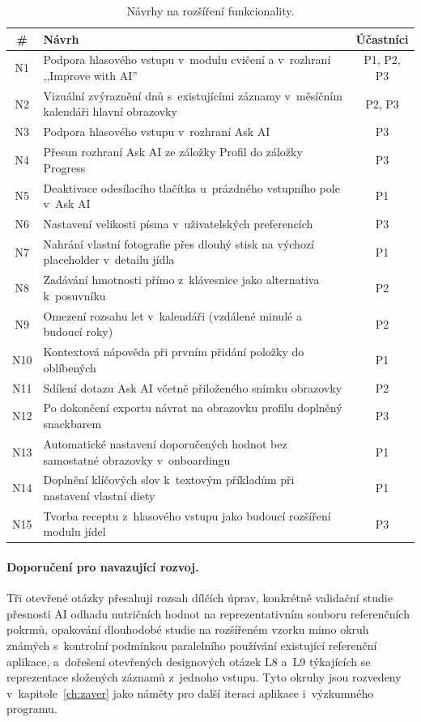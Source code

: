 \begin{table}[ht]
	\centering
	\caption{Návrhy na rozšíření funkcionality.}
	\label{tab:navrhyFunkce}
	\small
	\begin{tabularx}{\textwidth}{@{}c X c@{}}
		\toprule
		\textbf{\#} & \textbf{Návrh} & \textbf{Účastníci} \\
		\midrule
		N1 & Podpora hlasového vstupu v~modulu cvičení a v~rozhraní ,,Improve with AI'' & P1, P2, P3 \\
		N2 & Vizuální zvýraznění dnů s~existujícími záznamy v~měsíčním kalendáři hlavní obrazovky & P2, P3 \\
		N3 & Podpora hlasového vstupu v~rozhraní Ask AI & P3 \\
		N4 & Přesun rozhraní Ask AI ze záložky Profil do záložky Progress & P3 \\
		N5 & Deaktivace odesílacího tlačítka u~prázdného vstupního pole v~Ask AI & P1 \\
		N6 & Nastavení velikosti písma v~uživatelských preferencích & P3 \\
		N7 & Nahrání vlastní fotografie přes dlouhý stisk na výchozí placeholder v~detailu jídla & P1 \\
		N8 & Zadávání hmotnosti přímo z~klávesnice jako alternativa k~posuvníku & P2 \\
		N9 & Omezení rozsahu let v~kalendáři (vzdálené minulé a budoucí roky) & P2 \\
		N10 & Kontextová nápověda při prvním přidání položky do oblíbených & P1 \\
		N11 & Sdílení dotazu Ask AI včetně přiloženého snímku obrazovky & P2 \\
		N12 & Po dokončení exportu návrat na obrazovku profilu doplněný snackbarem & P3 \\
		N13 & Automatické nastavení doporučených hodnot bez samostatné obrazovky v~onboardingu & P1 \\
		N14 & Doplnění klíčových slov k~textovým příkladům při nastavení vlastní diety & P1 \\
		N15 & Tvorba receptu z~hlasového vstupu jako budoucí rozšíření modulu jídel & P3 \\
		\bottomrule
	\end{tabularx}
\end{table}

\paragraph{Doporučení pro navazující rozvoj.}
Tři otevřené otázky přesahují rozsah dílčích úprav, konkrétně validační studie přesnosti AI odhadu nutričních hodnot na reprezentativním souboru referenčních pokrmů, opakování dlouhodobé studie na rozšířeném vzorku mimo okruh známých s~kontrolní podmínkou paralelního používání existující referenční aplikace, a~dořešení otevřených designových otázek L8 a~L9 týkajících se reprezentace složených záznamů z~jednoho vstupu.
Tyto okruhy jsou rozvedeny v~kapitole~\ref{ch:zaver} jako náměty pro další iteraci aplikace i~výzkumného programu.
